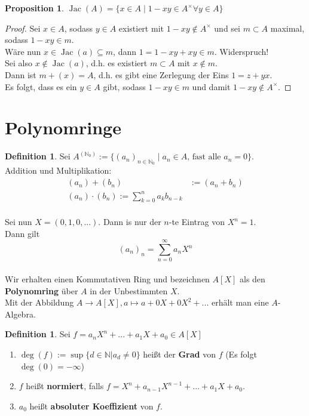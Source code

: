 \documentclass[10pt,a4paper]{article}
\newcommand{\N}{\ensuremath{\mathbb{N}}}
\newcommand{\Jac}{\ensuremath{\operatorname{Jac}}}
\newcounter{thm}[section]
\theoremstyle{definition}
\newtheorem{definition}[thm]{Definition}
\newtheorem{prop}[thm]{Proposition}
\theoremstyle{plain}
\theoremstyle{remark}
\begin{document}
\begin{prop}\label{118prop}
	$\Jac(A)=\{x\in A\mid 1-xy\in A^\times\forall y\in A \}$
\end{prop}
\begin{proof}
	Sei $x\in A$, sodass $y\in A$ existiert mit $1-xy\notin A^\times$ und sei $m\subset A$ maximal, sodass $1-xy\in m$.\\
	Wäre nun $x\in \Jac(a)\subseteq m$, dann $1=1-xy+xy\in m$. Widerspruch!\\
	Sei also $x\notin\Jac(a)$, d.h. es existiert $m\subset A$ mit $x\notin m$.\\
	Dann ist $m+(x)=A$, d.h. es gibt eine Zerlegung der Eins $1=z+yx$.\\
	Es folgt, dass es ein $y\in A$ gibt, sodass $1-xy\in m$ und damit $1-xy\notin A^\times$.
\end{proof}





\section{Polynomringe}


\begin{definition}
	Sei $A^{(\N_0)}:=\{(a_n)_{n\in\N_0}\mid \text{$a_n\in A$, fast alle $a_n=0$}\}$.\\
	Addition und Multiplikation:
	\begin{align*}
	(a_n)+(b_n)&:=(a_n+b_n)\\
	(a_n)\cdot(b_n):=\sum_{k=0}^{n}a_kb_{n-k}
	\end{align*}\\
	Sei nun $X=(0,1,0,...)$. Dann is nur der $n$-te Eintrag von $X^n=1$.\\
	Dann gilt
	\[(a_n)_n=\sum_{n=0}^{\infty}a_nX^n\]\\
	Wir erhalten einen Kommutativen Ring und bezeichnen $A[X]$ als den \textbf{Polynomring} über $A$ in der Unbestimmten $X$.\\
	Mit der Abbildung $A\to A[X],a\mapsto a+0X+0X^2+...$ erhält man eine $A$-Algebra.
\end{definition}

\begin{definition}
	Sei $f=a_nX^n+...+a_1X+a_0\in A[X]$
	\begin{enumerate}
		\item $\deg(f):=\sup\{d\in\N|a_d\neq 0\}$ heißt der \textbf{Grad} von $f$
		(Es folgt $\deg(0)=-\infty$)
		\item $f$ heißt \textbf{normiert}, falls $f=X^n+a_{n-1}X^{n-1}+...+a_1X+a_0$.
		\item $a_0$ heißt \textbf{absoluter Koeffizient} von $f$.
	\end{enumerate}
\end{definition}
\end{document}
